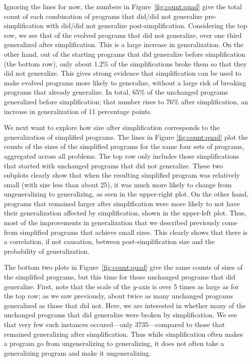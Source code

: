 Ignoring the lines for now, the numbers in Figure~\ref{fig:count:quad} give the total count of each combination of programs that did/did not generalize pre-simplification with  did/did not generalize post-simplification. Considering the top row, we see that of the evolved programs that did not generalize, over one third generalized after simplification. This is a large increase in generalization. On the other hand, out of the starting programs that did generalize before simplification (the bottom row), only about 1.2\% of the simplifications broke them so that they did not generalize. This gives strong evidence that simplification can be used to make evolved programs more likely to generalize, without a large risk of breaking programs that already generalize. In total, 65\% of the unchanged programs generalized before simplification; that number rises to 76\% after simplification, an increase in generalization of 11 percentage points.


We next want to explore how size after simplification corresponds to the generalization of simplified programs. The lines in Figure \ref{fig:count:quad} plot the counts of the sizes of the simplified programs for the same four sets of programs, aggregated across all problems. The top row only includes those simplifications that started with unchanged programs that did not generalize. These two subplots clearly show that when the resulting simplified program was relatively small (with size less than about 25), it was much more likely to change from ungeneralizing to generalizing, as seen in the upper-right plot. On the other hand, programs that remained larger after simplification were more likely to not have their generalization affected by simplification, shown in the upper-left plot. Thus, most of the improvements in generalization that we described previously come from simplified programs that achieve small sizes. This clearly shows that there is a correlation, if not causation, between post-simplification size and the probability of generalization.

The bottom two plots in Figure~\ref{fig:count:quad} give the same counts of sizes of the simplified programs, but this time for those unchanged programs that did generalize. First, note that the scale of the $y$-axis is over 5 times as large as for the top row; as we saw previously, about twice as many unchanged programs generalized as those that did not. Here, we are interested in whether many of the unchanged programs that did generalize were broken by simplification. We see that very few such instances occured---only 3735---compared to those that remained generalizing after simplification. Thus while simplification often makes a program go from ungeneralizing to generalizing, it does not often take a generalizing program and make it ungeneralizing.

